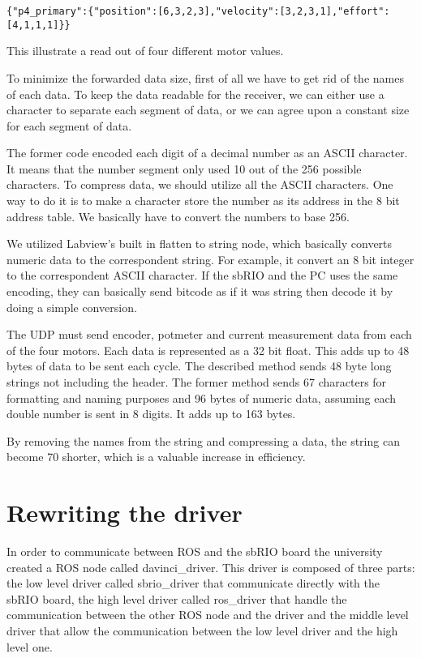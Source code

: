 \begin{verbatim}
{"p4_primary":{"position":[6,3,2,3],"velocity":[3,2,3,1],"effort":[4,1,1,1]}}
\end{verbatim}
This illustrate a read out of four different motor values.

To minimize the forwarded data size, first of all we have to get rid of the names of each data. To keep the data readable for the receiver, we can either use a character to separate each segment of data, or we can agree upon a constant size for each segment of data.

The former code encoded each digit of a decimal number as an ASCII character. It means that the number segment only used 10 out of the 256 possible characters. To compress data, we should utilize all the ASCII characters. One way to do it is to make a character store the number as its address in the 8 bit address table. We basically have to convert the numbers to base 256.

We utilized Labview's built in flatten to string node, which basically converts numeric data to the correspondent string. For example, it convert an 8 bit integer to the correspondent ASCII character. If the sbRIO and the PC uses the same encoding, they can basically send bitcode as if it was string then decode it by doing a simple conversion.  
 
The UDP must send encoder, potmeter and current measurement data from each of the four motors. Each data is represented as a 32 bit float. This adds up to 48 bytes of data to be sent each cycle. The described method sends 48 byte long strings not including the header. The former method sends 67 characters for formatting and naming purposes and 96 bytes of numeric data, assuming each double number is sent in 8 digits. It adds up to 163 bytes.

By removing the names from the string and compressing a data, the string can become 70 shorter, which is a valuable increase in efficiency.



\section{Rewriting the driver}

In order to communicate between ROS and the sbRIO board the university created a ROS node called davinci\_driver. This driver is composed of three parts: the low level driver called sbrio\_driver that communicate directly with the sbRIO board, the high level driver called ros\_driver that handle the communication between the other ROS node and the driver and the middle level driver that allow the communication between the low level driver and the high level one.

